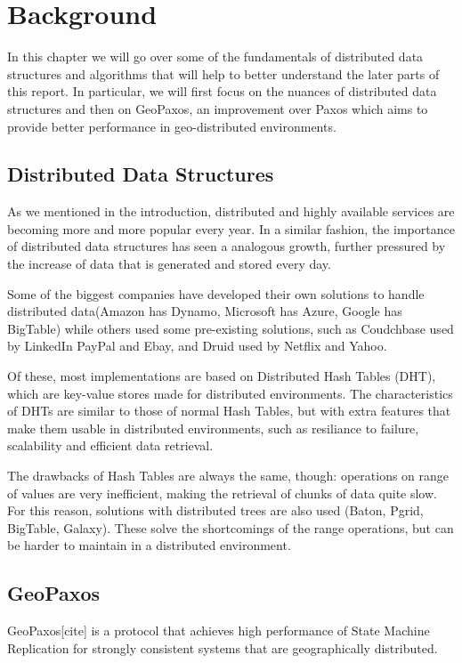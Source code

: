 \chapter{Background}\label{sec:Background}
In this chapter we will go over some of the fundamentals of distributed data structures and algorithms that will help to better understand the later parts of this report. In particular, we will first focus on the nuances of distributed data structures and then on  GeoPaxos, an improvement over Paxos which aims to provide better performance in geo-distributed environments.

\section{Distributed Data Structures}\label{sec:distributed-data-structures}
As we mentioned in the introduction, distributed and highly available services are becoming more and more popular every year. In a similar fashion, the importance of distributed data structures has seen a analogous growth, further pressured by the increase of data that is generated and stored every day. 

Some of the biggest companies have developed their own solutions to handle distributed data(Amazon has Dynamo, Microsoft has Azure, Google has BigTable) while others used some pre-existing solutions, such as Coudchbase used by LinkedIn PayPal and Ebay, and Druid used by Netflix and Yahoo.

Of these, most implementations are based on Distributed Hash Tables (DHT), which are key-value stores made for distributed environments. 
The characteristics of DHTs are similar to those of normal Hash Tables, but with extra features that make them usable in distributed environments, such as resiliance to failure, scalability and efficient data retrieval.

The drawbacks of Hash Tables are always the same, though: operations on range of values are very inefficient, making the retrieval of chunks of data quite slow. For this reason, solutions with distributed trees are also used (Baton, Pgrid, BigTable, Galaxy). These solve the shortcomings of the range operations, but can be harder to maintain in a distributed environment.

\section{GeoPaxos}\label{sec:GeoPaxos}
GeoPaxos[cite] is a protocol that achieves high performance of State Machine Replication for strongly consistent systems that are geographically distributed. 


